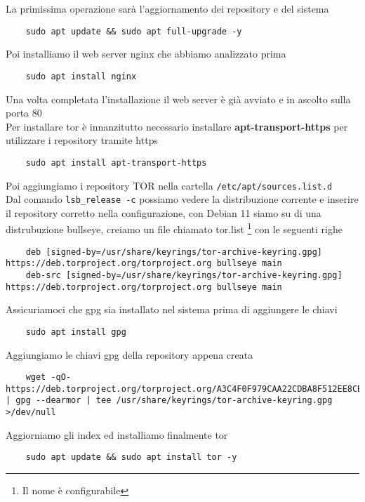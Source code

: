 La primissima operazione sarà l'aggiornamento dei repository e del sistema
\begin{lstlisting}
    sudo apt update && sudo apt full-upgrade -y
\end{lstlisting}

Poi installiamo il web server nginx che abbiamo analizzato prima
\begin{lstlisting}
    sudo apt install nginx
\end{lstlisting}

Una volta completata l'installazione il web server è già avviato e in ascolto sulla porta 80 \\

Per installare tor è innanzitutto necessario installare \textbf{apt-transport-https} per utilizzare i repository tramite https
\begin{lstlisting}
    sudo apt install apt-transport-https
\end{lstlisting}
Poi aggiungiamo i repository TOR nella cartella \lstinline{/etc/apt/sources.list.d} \\
Dal comando \lstinline{lsb_release -c} possiamo vedere la distribuzione corrente e inserire il repository corretto nella configurazione, con Debian 11 siamo su di una distrubuzione bullseye, creiamo un file chiamato tor.list \footnote{Il nome è configurabile} con le seguenti righe
\begin{lstlisting}
    deb [signed-by=/usr/share/keyrings/tor-archive-keyring.gpg] https://deb.torproject.org/torproject.org bullseye main
    deb-src [signed-by=/usr/share/keyrings/tor-archive-keyring.gpg] https://deb.torproject.org/torproject.org bullseye main
\end{lstlisting}
Assicuriamoci che gpg sia installato nel sistema prima di aggiungere le chiavi
\begin{lstlisting}
    sudo apt install gpg
\end{lstlisting}
Aggiungiamo le chiavi gpg della repository appena creata
\begin{lstlisting}
    wget -qO- https://deb.torproject.org/torproject.org/A3C4F0F979CAA22CDBA8F512EE8CBC9E886DDD89.asc | gpg --dearmor | tee /usr/share/keyrings/tor-archive-keyring.gpg >/dev/null
\end{lstlisting}
Aggiorniamo gli index ed installiamo finalmente tor
\begin{lstlisting}
    sudo apt update && sudo apt install tor -y 
\end{lstlisting} \cite{TorRepo}
